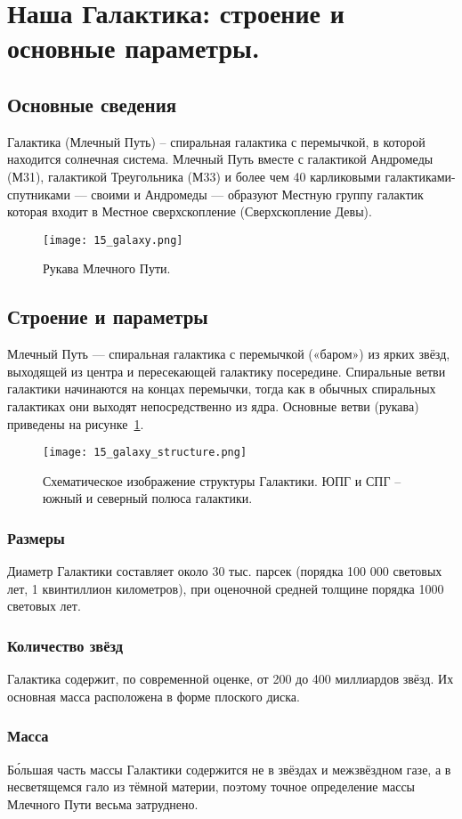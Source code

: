 \section{Наша Галактика: строение и основные параметры.}
\subsection{Основные сведения}
Галактика (Млечный Путь) -- спиральная галактика с перемычкой, в которой находится солнечная система. Млечный Путь вместе с галактикой Андромеды (М31), галактикой Треугольника (М33) и более чем 40 карликовыми галактиками-спутниками — своими и Андромеды — образуют Местную группу галактик которая входит в Местное сверхскопление (Сверхскопление Девы). 
\begin{figure}[H]
    \centering
    \texttt{[image: 15\_galaxy.png]}
    \caption{Рукава Млечного Пути.}
    \label{fig:galaxy_1}
\end{figure}
\subsection{Строение и параметры}
Млечный Путь — спиральная галактика с перемычкой («баром») из ярких звёзд, выходящей из центра и пересекающей галактику посередине. Спиральные ветви галактики начинаются на концах перемычки, тогда как в обычных спиральных галактиках они выходят непосредственно из ядра. Основные ветви (рукава) приведены на рисунке~\ref{fig:galaxy_1}.  
\begin{figure}[H]
    \centering
    \texttt{[image: 15\_galaxy\_structure.png]}
    \caption{Схематическое изображение структуры Галактики. ЮПГ и СПГ -- южный и северный полюса галактики.}
    \label{fig:galay_2}
\end{figure}
\subsubsection{Размеры}
Диаметр Галактики составляет около 30 тыс. парсек (порядка 100 000 световых лет, 1 квинтиллион километров), при оценочной средней толщине порядка 1000 световых лет.
\subsubsection{Количество звёзд}
Галактика содержит, по современной оценке, от 200 до 400 миллиардов звёзд. Их основная масса расположена в форме плоского диска.
\subsubsection{Масса}
Б\'{о}льшая часть массы Галактики содержится не в звёздах и межзвёздном газе, а в несветящемся гало из тёмной материи, поэтому точное определение массы Млечного Пути весьма затруднено.

